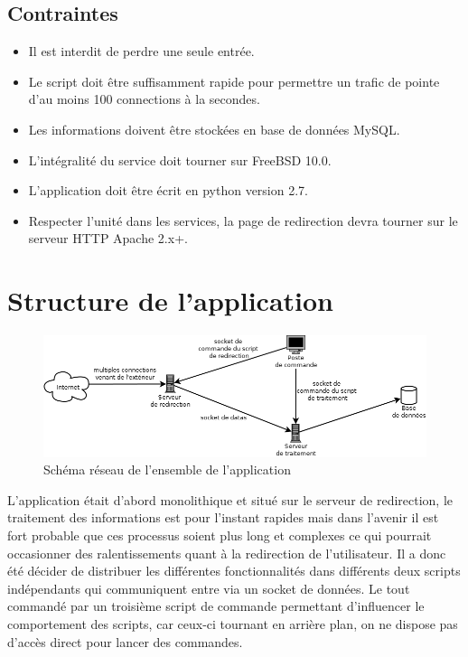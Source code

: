 \subsection*{Contraintes}
\begin{itemize}
\item Il est interdit de perdre une seule entrée.
\item Le script doit être suffisamment rapide pour permettre un trafic de pointe d'au moins 100 connections à la secondes. 
\item Les informations doivent être stockées en base de données MySQL.
\item L'intégralité du service doit tourner sur FreeBSD 10.0.
\item L'application doit être écrit en python version 2.7.
\item Respecter l'unité dans les services, la page de redirection devra tourner sur le serveur HTTP Apache 2.x+.
\end{itemize}

\newpage

\section*{Structure de l'application}

\begin{figure}[h!]
	\centering
	\includegraphics[scale=0.4]{images/cyatracking_network_scheme.png}
	\caption{Schéma réseau de l'ensemble de l'application}
\end{figure}

L'application était d'abord monolithique et situé sur le serveur de redirection, le traitement des informations est pour l'instant rapides mais dans l'avenir il est fort probable que ces processus soient plus long et complexes ce qui pourrait occasionner des ralentissements quant à la redirection de l'utilisateur. Il a donc été décider de distribuer les différentes fonctionnalités dans différents deux scripts indépendants qui communiquent entre via un socket de données. Le tout commandé par un troisième script de commande permettant d'influencer le comportement des scripts, car ceux-ci tournant en arrière plan, on ne dispose pas d'accès direct pour lancer des commandes.

